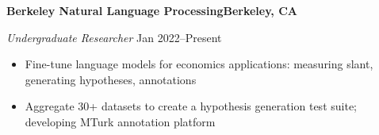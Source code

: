 \textbf{Berkeley Natural Language Processing\hfill Berkeley, CA}\par
\textit{Undergraduate Researcher} \hfill Jan 2022--Present\par
\begin{itemize}
	\item Fine-tune language models for economics applications: measuring slant, generating hypotheses, annotations
	\item Aggregate 30+ datasets to create a hypothesis generation test suite; developing MTurk annotation platform
\end{itemize} \par
